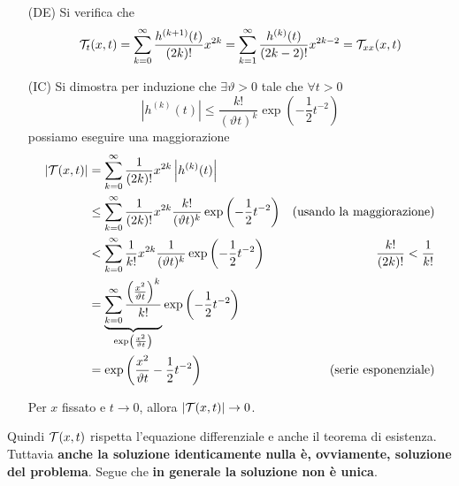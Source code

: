 \documentclass[10pt,a4paper,twoside,openright]{book}
\begin{document}
\begin{dimostrazione}
    \ \\
    \begin{enumerate}
        \item[(DE)] Si verifica che
              \begin{equation*}
                  \mathcal{T} _{t}(x,t) =\sum\limits _{k=0}^{\infty }\frac{h^{(k+1)}(t)}{(2k) !} x^{2k} =\sum\limits _{k=1}^{\infty }\frac{h^{(k)}(t)}{(2k-2) !} x^{2k-2} =\mathcal{T} _{xx}(x,t)
              \end{equation*}
        \item[(IC)] Si dimostra per induzione che $\exists \vartheta  >0$ tale che $\forall t >0$
              \begin{equation*}
                  \left| h^{(k)}(t)\right| \leqslant \frac{k!}{(\vartheta t)^{k}}\exp\left(-\frac{1}{2} t^{-2}\right)
              \end{equation*}possiamo eseguire una maggiorazione
              \begin{align*}
                  | \mathcal{T} (x,t)| & =\sum\limits _{k=0}^{\infty }\frac{1}{(2k) !} x^{2k}\left| h^{(k)}(t)\right|                                                                                                     &                                  \\
                                & \leq \sum\limits _{k=0}^{\infty }\frac{1}{(2k) !} x^{2k}\frac{k!}{(\vartheta t)^{k}}\exp\left(-\frac{1}{2} t^{-2}\right)                                                    & \text{(usando la maggiorazione)} \\
                                & < \sum\limits _{k=0}^{\infty }\frac{1}{k!} x^{2k}\frac{1}{(\vartheta t)^{k}}\exp\left(-\frac{1}{2} t^{-2}\right)                                                                 & \frac{k!}{(2k) !} < \frac{1}{k!} \\
                                & =\underbrace{\sum\limits _{k=0}^{\infty }\frac{\left(\frac{x^{2}}{\vartheta t}\right)^{k}}{k!}}_{\exp\left(\frac{x^{2}}{\vartheta t}\right)}\exp\left(-\frac{1}{2} t^{-2}\right) &                                  \\
                                & =\exp\left(\frac{x^{2}}{\vartheta t} -\frac{1}{2} t^{-2}\right)                                                                                                                  & \text{(serie esponenziale)}
              \end{align*}

              Per $x$ fissato e $t\rightarrow 0$, allora $| \mathcal{T} (x,t)| \rightarrow 0$.
    \end{enumerate}
\end{dimostrazione}
Quindi $\mathcal{T} (x,t)$ rispetta l'equazione differenziale e anche il teorema di esistenza. Tuttavia \textbf{anche la soluzione identicamente nulla è, ovviamente, soluzione del problema}. Segue che \textbf{in generale la soluzione non è unica}.
\end{document}

